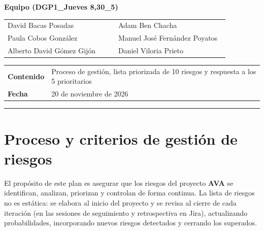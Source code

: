 \documentclass[11pt,a4paper]{article}
\begin{document}
\begin{titlepage}
  {\large\bfseries\color{avaprimary} Equipo (DGP1\_Jueves 8,30\_5)\par}
  \vspace{0.22cm}
  \begin{tabular}{@{}L{0.48\linewidth}L{0.48\linewidth}@{}}
    David Bacas Posadas & Adam Ben Chacha \\
    Paula Cobos González & Manuel José Fernández Poyatos \\
    Alberto David Gómez Gijón & Daniel Viloria Prieto \\
  \end{tabular}

  \vspace{0.35cm}
  \begin{tabularx}{\linewidth}{@{}l X@{}}
    {\bfseries\color{avaprimary} Contenido} & Proceso de gestión, lista priorizada de 10 riesgos y respuesta a los 5 prioritarios \\
    {\bfseries\color{avaprimary} Fecha} & 20 de noviembre de 2026 \\
  \end{tabularx}

  \vspace{0.4cm}
  {\color{avaaccent}\rule{\linewidth}{1.5pt}\par}
\end{titlepage}

\setcounter{page}{2}

\section{Proceso y criterios de gestión de riesgos}

El propósito de este plan es asegurar que los riesgos del proyecto \textbf{AVA} se identifican, analizan, priorizan y controlan de forma continua. La lista de riesgos no es estática: se elabora al inicio del proyecto y se revisa al cierre de cada iteración (en las sesiones de seguimiento y retrospectiva en Jira), actualizando probabilidades, incorporando nuevos riesgos detectados y cerrando los superados.
\end{document}

